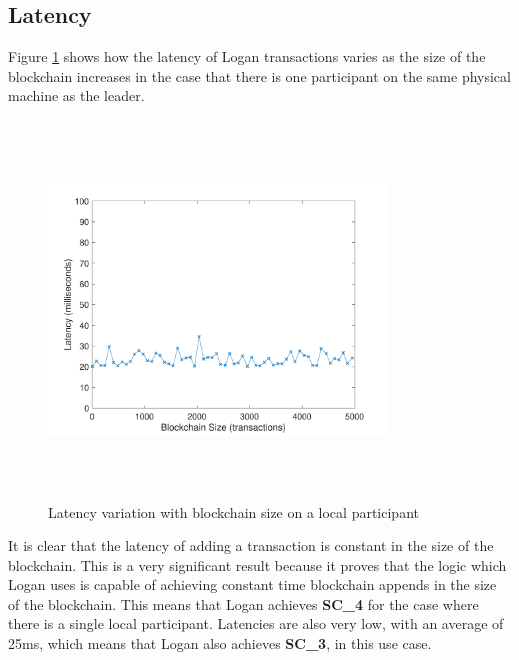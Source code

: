 \documentclass[12pt,a4paper,twoside,openright]{report}
\begin{document}
	\subsection{Latency}
	Figure \ref{fig:locallatency} shows how the latency of Logan transactions varies as the size of the blockchain increases in the case that there is one participant on the same physical machine as the leader. 
	\begin{figure}
		\centering
		\includegraphics[width=0.8\textwidth, height=10cm]{figs/local_latency_vs_size.pdf}
		\caption{Latency variation with blockchain size on a local participant}
		\label{fig:locallatency}
	\end{figure}
	It is clear that the latency of adding a transaction is constant in the size of the blockchain.
	This is a very significant result because it proves that the logic which Logan uses is capable of achieving constant time blockchain appends in the size of the blockchain.
	This means that Logan achieves \textbf{SC\_4} for the case where there is a single local participant.
	Latencies are also very low, with an average of 25ms, which means that Logan also achieves \textbf{SC\_3}, in this use case.\\
\end{document}
